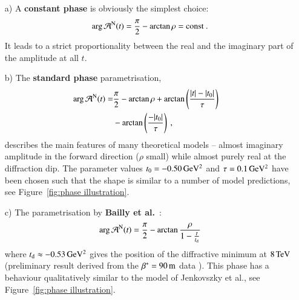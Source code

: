 \begin{enumerate}

\item[a)]
A {\bf constant phase} is obviously the simplest choice:
\begin{equation}
\label{eq:nuc phase con}
\arg {\cal A}^{\rm N}(t) = {\pi\over 2} - \arctan\rho = \hbox{const} \ .
\end{equation}
It leads to a strict proportionality between the real and the imaginary part of the amplitude at all $t$.

\item[b)]
The {\bf standard phase} parametrisation,
\begin{equation}
\label{eqn:nuc phase std}
	\begin{aligned}
		\arg {\cal A}^{\rm N}(t) =	& {\pi\over 2} - \arctan\rho + \arctan \left(\frac{|t|-|t_{0}|}{\tau}\right)\cr
									&- \arctan \left(\frac{-|t_{0}|}{\tau}\right) \: ,
	\end{aligned}
\end{equation}
describes the main features of many theoretical models -- almost imaginary amplitude in the forward direction ($\rho$ small) while almost purely real at the diffraction dip. The parameter values $t_0 = - 0.50\,{\rm GeV^2}$ and $\tau = 0.1\,{\rm GeV^2}$ have been chosen such that the shape is similar to a number of model predictions, see Figure~\ref{fig:phase illustration}.

\item[c)]
The parametrisation by {\bf Bailly et al.}~\cite{bailly87}:
\begin{equation}
\label{eq:nuc phase bai}
	\arg {\cal A}^{\rm N}(t) = {\pi\over 2} - \arctan {\rho\over 1 - {t\over t_{\rm d}}}
\end{equation}
where $t_{\rm d} \approx -0.53\,{\rm GeV^2}$ gives the position of the diffractive minimum at $8\,{\rm TeV}$ (preliminary result derived from the $\beta^* = 90\,{\rm m}$ data \cite{8tev-90m}). This phase has a behaviour qualitatively similar to the model of Jenkovszky et al., see Figure~\ref{fig:phase illustration}.


\end{enumerate}
